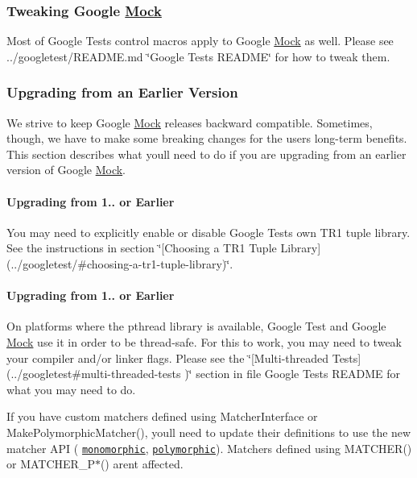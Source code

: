 \subsubsection*{Tweaking Google \hyperlink{class_mock}{Mock}}

Most of Google Test\textquotesingle{}s control macros apply to Google \hyperlink{class_mock}{Mock} as well. Please see ../googletest/\+R\+E\+A\+D\+ME.md \char`\"{}\+Google Test\textquotesingle{}s R\+E\+A\+D\+M\+E\char`\"{} for how to tweak them.

\subsubsection*{Upgrading from an Earlier Version}

We strive to keep Google \hyperlink{class_mock}{Mock} releases backward compatible. Sometimes, though, we have to make some breaking changes for the users\textquotesingle{} long-\/term benefits. This section describes what you\textquotesingle{}ll need to do if you are upgrading from an earlier version of Google \hyperlink{class_mock}{Mock}.

\paragraph*{Upgrading from 1.. or Earlier}

You may need to explicitly enable or disable Google Test\textquotesingle{}s own T\+R1 tuple library. See the instructions in section \char`\"{}\mbox{[}\+Choosing a T\+R1 Tuple
\+Library\mbox{]}(../googletest/\#choosing-\/a-\/tr1-\/tuple-\/library)\char`\"{}.

\paragraph*{Upgrading from 1.. or Earlier}

On platforms where the pthread library is available, Google Test and Google \hyperlink{class_mock}{Mock} use it in order to be thread-\/safe. For this to work, you may need to tweak your compiler and/or linker flags. Please see the \char`\"{}\mbox{[}\+Multi-\/threaded Tests\mbox{]}(../googletest\#multi-\/threaded-\/tests
)\char`\"{} section in file Google Test\textquotesingle{}s R\+E\+A\+D\+ME for what you may need to do.

If you have custom matchers defined using {\ttfamily Matcher\+Interface} or {\ttfamily Make\+Polymorphic\+Matcher()}, you\textquotesingle{}ll need to update their definitions to use the new matcher A\+PI ( \href{http://code.google.com/p/googlemock/wiki/CookBook#Writing_New_Monomorphic_Matchers}{\tt monomorphic}, \href{http://code.google.com/p/googlemock/wiki/CookBook#Writing_New_Polymorphic_Matchers}{\tt polymorphic}). Matchers defined using {\ttfamily M\+A\+T\+C\+H\+E\+R()} or {\ttfamily M\+A\+T\+C\+H\+E\+R\+\_\+\+P$\ast$()} aren\textquotesingle{}t affected.

